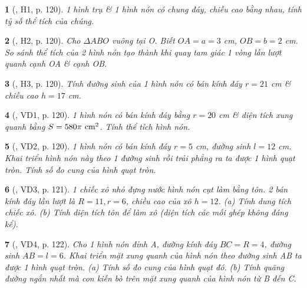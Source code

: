 \documentclass{article}
\newtheorem{baitoan}{}
\begin{document}
\begin{baitoan}[\cite{Binh_boi_duong_Toan_9_tap_2}, H1, p. 120]
	1 hình trụ \& 1 hình nón có chung đáy, chiều cao bằng nhau, tính tỷ số thể tích của chúng.
\end{baitoan}

\begin{baitoan}[\cite{Binh_boi_duong_Toan_9_tap_2}, H2, p. 120]
	Cho $\Delta ABO$ vuông tại O. Biết $OA = a = 3$ {\rm cm}, $OB = b = 2$ {\rm cm}. So sánh thể tích của 2 hình nón tạo thành khi quay tam giác 1 vòng lần lượt quanh cạnh OA \& cạnh OB.
\end{baitoan}

\begin{baitoan}[\cite{Binh_boi_duong_Toan_9_tap_2}, H3, p. 120]
	Tính đường sinh của 1 hình nón có bán kính đáy $r = 21$ {\rm cm} \& chiều cao $h = 17$ {\rm cm}.
\end{baitoan}

\begin{baitoan}[\cite{Binh_boi_duong_Toan_9_tap_2}, VD1, p. 120]
	1 hình nón có bán kính đáy bằng $r = 20$ {\rm cm} \& diện tích xung quanh bằng $S = 580\pi\ {\rm cm}^2$. Tính thể tích hình nón.
\end{baitoan}

\begin{baitoan}[\cite{Binh_boi_duong_Toan_9_tap_2}, VD2, p. 120]
	1 hình nón có bán kính đáy $r = 5$ {\rm cm}, đường sinh $l = 12$ {\rm cm}. Khai triển hình nón này theo 1 đường sinh rồi trải phẳng ra ta được 1 hình quạt tròn. Tính số đo cung của hình quạt tròn.
\end{baitoan}

\begin{baitoan}[\cite{Binh_boi_duong_Toan_9_tap_2}, VD3, p. 121]
	1 chiếc xô nhỏ đựng nước hình nón cụt làm bằng tôn. 2 bán kính đáy lần lượt là $R = 11,r = 6$, chiều cao của xô $h = 12$. (a) Tính dung tích chiếc xô. (b) Tính diện tích tôn để làm xô (diện tích các mối ghép không đáng kể).
\end{baitoan}

\begin{baitoan}[\cite{Binh_boi_duong_Toan_9_tap_2}, VD4, p. 122]
	Cho 1 hình nón đỉnh A, đường kính đáy $BC = R = 4$, đường sinh $AB = l = 6$. Khai triển mặt xung quanh của hình nón theo đường sinh AB ta được 1 hình quạt tròn. (a) Tính số đo cung của hình quạt đó. (b) Tính quãng đường ngắn nhất mà con kiến bò trên mặt xung quanh của hình nón từ B đến C.
\end{baitoan}
\end{document}
